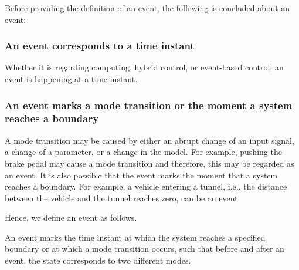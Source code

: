Before providing the definition of an event, the following is concluded about an event:

\subsubsection{An event corresponds to a time instant}
Whether it is regarding computing, hybrid control, or event-based control, an event is happening at a time instant.

\subsubsection{An event marks a mode transition or the moment a system reaches a boundary}
A mode transition may be caused by either an abrupt change of an input signal, a change of a parameter, or a change in the model. For example, pushing the brake pedal may cause a mode transition and therefore, this may be regarded as an event. It is also possible that the event marks the moment that a system reaches a boundary. For example, a vehicle entering a tunnel, i.e., the distance between the vehicle and the tunnel reaches zero, can be an event.


Hence, we define an event as follows.
\begin{definition}[Event] \label{def:event}
	An event marks the time instant at which the system reaches a specified boundary or at which a mode transition occurs, such that before and after an event, the state corresponds to two different modes.
\end{definition}

